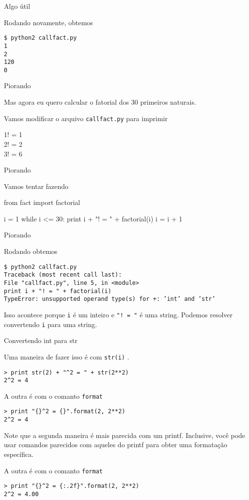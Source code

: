 \documentclass[12pt]{article}
\newcommand{\iframe}[1]{
\Large
\begin{center}
#1
\end{center}
}
\newcommand{\iframeend}{ \vfill \newpage}
\newcommand{\aframe}[1]{
\Large
\begin{center}
#1
\end{center}
\vfill
\newpage
}
\newcommand{\tit}[1]{
{\LARGE \color{green} #1}
\\ \vspace{0.5cm}
\vfill
}
\newcommand{\cmd}[1]{
\begin{flushleft}
{\color{yellow} \tt \$ #1 }\\
\end{flushleft}
}
\newcommand{\cmdpy}[1]{
\begin{flushleft}
{\color{yellow} \tt > #1 }\\
\end{flushleft}
}
\newcommand{\inline}[1]{
{\color{yellow} \tt #1} }
\begin{document}
\aframe{
  \tit{Algo útil}
  Rodando novamente, obtemos
  \cmd{python2 callfact.py \\
1 \\
2 \\
120 \\
0
}
}

\aframe{
  \tit{Piorando}
  Mas agora eu quero calcular o fatorial dos 30 primeiros naturais.
  
  Vamos modificar o arquivo \inline{callfact.py} para imprimir
  \begin{flushleft}
    \ttfamily \color{yellow}
    1! = 1 \\
    2! = 2 \\
    3! = 6
  \end{flushleft}
}

\iframe{
  \tit{Piorando}
  Vamos tentar fazendo
}
\begin{file}
from fact import factorial

i = 1
while i <= 30:
  print i + "! = " + factorial(i)
  i = i + 1
\end{file}
\iframeend

\aframe{
  \tit{Piorando}
  Rodando obtemos
  \cmd{python2 callfact.py \\
Traceback (most recent call last): \\
File "callfact.py", line 5, in <module> \\
print i + "! = " + factorial(i) \\
TypeError: unsupported operand type(s) for +: 'int' and 'str'
}
Isso acontece porque \inline{i} é um inteiro e \inline{"! = "} é uma string.
Podemos resolver convertendo \inline{i} para uma string.
}

\aframe{
  \tit{Convertendo int para str}
Uma maneira de fazer isso é com \inline{str(i)}.
  \cmdpy{print str(2) + "\textasciicircum2 = " + str(2**2) \\
  2\textasciicircum2 = 4}

  A outra é com o comanto \inline{format}
  \cmdpy{print "\{\}\textasciicircum2 = \{\}".format(2, 2**2) \\
  2\textasciicircum2 = 4}
  
  Note que a segunda maneira é mais parecida com um printf. Inclusive, você pode
  usar comandos parecidos com aqueles do printf para obter uma formatação
  específica.

  A outra é com o comanto \inline{format}
  \cmdpy{print "\{\}\textasciicircum2 = \{:.2f\}".format(2, 2**2) \\
  2\textasciicircum2 = 4.00}
}
\end{document}
